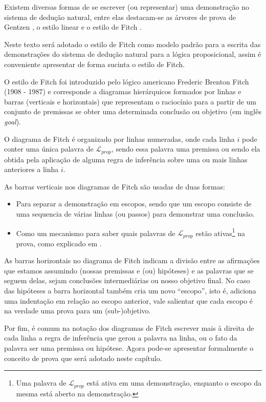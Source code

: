 Existem diversas formas de se escrever (ou representar) uma demonstração no sistema de dedução natural, entre elas destacam-se as árvores de prova de Gentzen \cite{BenjaV1}, o estilo linear \cite{copi1981, mortari2001} e o estilo de Fitch \cite{joaoPavao2014, fitch1953}. 

Neste texto será adotado o estilo de Fitch como modelo padrão para a escrita das demonstrações do sistema de dedução natural para a lógica proposicional, assim é conveniente apresentar de forma sucinta o estilo de Fitch.

O estilo de Fitch foi introduzido pelo lógico americano Frederic Brenton Fitch (1908 - 1987) e corresponde a diagramas hierárquicos formados por linhas e barras (verticais e horizontais) que representam o raciocínio para a partir de um conjunto de premissas se obter uma determinada conclusão ou objetivo (em inglês \textit{goal}).

O diagrama de Fitch é organizado por linhas numeradas, onde cada linha $i$ pode conter uma única palavra de $\mathcal{L}_{prop}$, sendo essa palavra uma premissa ou sendo ela obtida pela aplicação de alguma regra de inferência sobre uma ou mais linhas anteriores a linha $i$. 

As barras verticais nos diagramas de Fitch são usadas de duas formas:
\begin{itemize}
    \item[(1)] Para separar a demonstração em escopos, sendo que um escopo consiste de uma sequencia de várias linhas (ou passos) para demonstrar uma conclusão.
    \item[(2)] Como um mecanismo para saber quais palavras de $\mathcal{L}_{prop}$ estão ativas\footnote{Uma palavra de $\mathcal{L}_{prop}$ está ativa em uma demonstração, enquanto o escopo da mesma está aberto na demonstração.} na prova, como explicado em \cite{joaoPavao2014}. 
\end{itemize}

As barras horizontais no diagrama de Fitch indicam a divisão entre  as  afirmações  que  estamos  assumindo  (nossas premissas e (ou) hipóteses) e as palavras que se seguem delas, sejam conclusões intermediárias ou nosso objetivo final. No caso das hipóteses a barra horizontal também cria um novo ``escopo'', isto é, adiciona uma indentação em relação ao escopo anterior, vale salientar que cada escopo é na verdade uma prova para um (sub-)objetivo. 

Por fim, é comum na notação dos diagramas de Fitch escrever mais à direita de cada linha a regra de inferência que gerou a palavra na linha, ou o fato da palavra ser uma premissa ou hipótese. Agora pode-se apresentar formalmente o conceito de prova que será adotado neste capítulo.

